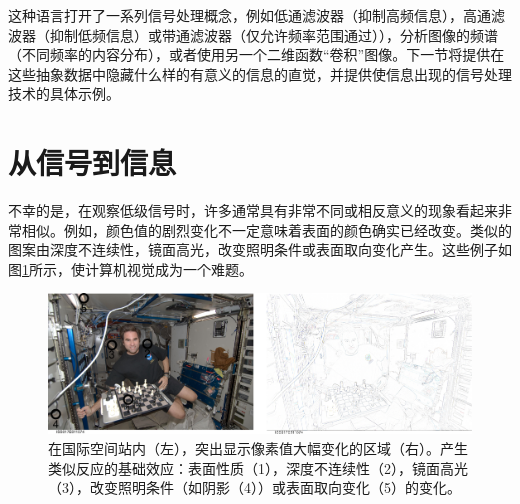 这种语言打开了一系列信号处理概念，例如低通滤波器（抑制高频信息），高通滤波器（抑制低频信息）或带通滤波器（仅允许频率范围通过）），分析图像的频谱（不同频率的内容分布），或者使用另一个二维函数“卷积”图像。下一节将提供在这些抽象数据中隐藏什么样的有意义的信息的直觉，并提供使信息出现的信号处理技术的具体示例。


\section{从信号到信息}
不幸的是，在观察低级信号时，许多通常具有非常不同或相反意义的现象看起来非常相似。例如，颜色值的剧烈变化不一定意味着表面的颜色确实已经改变。类似的图案由深度不连续性，镜面高光，改变照明条件或表面取向变化产生。这些例子如图\ref{fig:iss_edges}所示，使计算机视觉成为一个难题。


\begin{figure}[!htb]
	\centering
		\includegraphics[width=\textwidth]{figs/iss_edges}
	\caption{在国际空间站内（左），突出显示像素值大幅变化的区域（右）。产生类似反应的基础效应：表面性质（1），深度不连续性（2），镜面高光（3），改变照明条件（如阴影（4））或表面取向变化（5）的变化。
	\label{fig:iss_edges}}
\end{figure}

